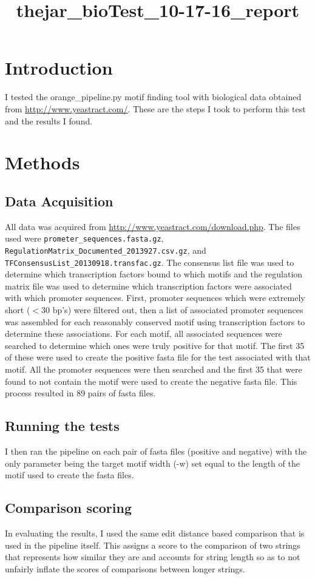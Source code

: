 \documentclass{article}
\title{thejar\_bioTest\_10-17-16\_report}
\begin{document}
\section{Introduction}
I tested the orange\_pipeline.py motif finding tool with biological data obtained
from \url{http://www.yeastract.com/}. These are the steps I took to perform
this test and the results I found.

\section{Methods}
\subsection{Data Acquisition}
All data was acquired from \url{http://www.yeastract.com/download.php}. The files
used were
\texttt{prometer\_sequences.fasta.gz},
\texttt{RegulationMatrix\_Documented\_2013927.csv.gz}, and
\texttt{TFConsensusList\_20130918.transfac.gz}.
The consensus list file was used to determine which transcription factors bound
to which motifs and the regulation matrix file was used to determine which
transcription factors were associated with which promoter sequences. First,
promoter sequences which were extremely short ($< 30$ bp's) were filtered out,
then a list of associated promoter sequences was assembled for each reasonably
conserved motif using transcription factors to determine these associations.
For each motif, all associated sequences were searched to determine which ones
were truly positive for that motif. The first 35 of these were used to create
the positive fasta file for the test associated with that motif. All the
promoter sequences were then searched and the first 35 that were found to not
contain the motif were used to create the negative fasta file. This process
resulted in 89 pairs of fasta files.
\subsection{Running the tests}
I then ran the pipeline on each pair of fasta files (positive and negative) with
the only parameter being the target motif width (-w) set equal to the length of
the motif used to create the fasta files.
\subsection{Comparison scoring}
In evaluating the results, I used the same edit distance based comparison that
is used in the pipeline itself. This assigns a score to the comparison of two
strings that represents how similar they are and accounts for string length so
as to not unfairly inflate the scores of comparisons between longer strings.
\end{document}
